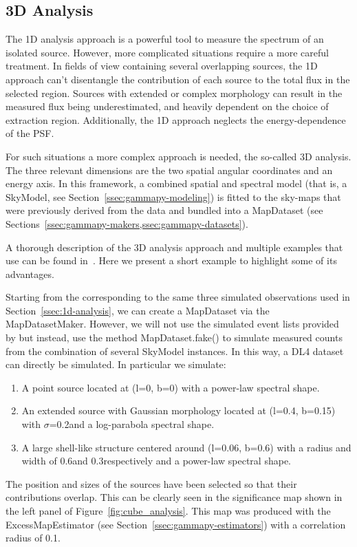 \subsection{3D Analysis}
\label{ssec:3d-analysis}
The 1D analysis approach is a powerful tool to measure the spectrum of an isolated source. However, more complicated situations require a more careful treatment. In fields of view containing several overlapping sources, the 1D approach can't disentangle the contribution of each source to the total flux in the selected region. Sources with extended or complex morphology can result in the measured flux being underestimated, and heavily dependent on the choice of extraction region. Additionally, the 1D approach neglects the energy-dependence of the PSF.

For such situations a more complex approach is needed, the so-called 3D analysis. The three relevant dimensions are the two spatial angular coordinates and an energy axis. In this framework, a combined spatial and spectral model (that is, a SkyModel, see Section~\ref{ssec:gammapy-modeling}) is fitted to the sky-maps that were previously derived from the data and bundled into a MapDataset (see Sections~\ref{ssec:gammapy-makers,ssec:gammapy-datasets}).

A thorough description of the 3D analysis approach and multiple examples that use \gammapy can be found in~\cite{Mohrmann2019}. Here we present a short example to highlight some of its advantages.

Starting from the \irfs corresponding to the same three simulated \cta observations used in Section~\ref{ssec:1d-analysis}, we can create a MapDataset via the MapDatasetMaker. However, we will not use the simulated event lists provided by \cta but instead, use the method MapDataset.fake() to simulate measured counts from the combination of several SkyModel instances. In this way, a DL4 dataset can directly be simulated. In particular we simulate:
\begin{enumerate}
	\item A point source located at (l=0\textdegree, b=0\textdegree) with a power-law spectral shape.
	\item An extended source with Gaussian morphology located at (l=0.4\textdegree, b=0.15\textdegree) with $\sigma$=0.2\textdegree and a log-parabola spectral shape.
	\item A large shell-like structure centered around (l=0.06\textdegree, b=0.6\textdegree) with a radius and width of 0.6\textdegree and 0.3\textdegree respectively and a power-law spectral shape.
\end{enumerate}
The position and sizes of the sources have been selected so that their contributions overlap. This can be clearly seen in the significance map shown in the left panel of Figure~\ref{fig:cube_analysis}. This map was produced with the ExcessMapEstimator (see Section~\ref{ssec:gammapy-estimators}) with a correlation radius of 0.1\textdegree.

